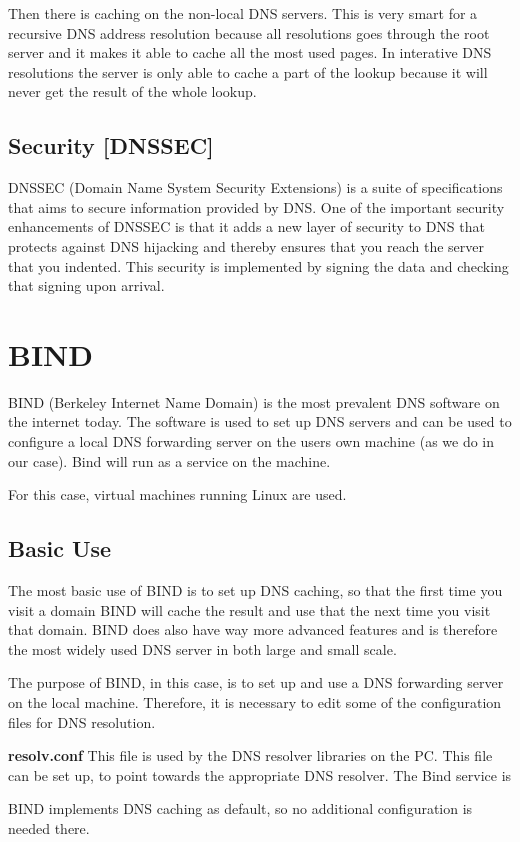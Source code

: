 Then there is caching on the non-local DNS servers. This is very smart for a recursive DNS address resolution because all resolutions goes through the root server and it makes it able to cache all the most used pages. In interative DNS resolutions the server is only able to cache a part of the lookup because it will never get the result of the whole lookup.

\subsection{Security [DNSSEC]}
DNSSEC (Domain Name System Security Extensions) is a suite of specifications that aims to secure information provided by DNS. One of the important security enhancements of DNSSEC is that it adds a new layer of security to DNS that protects against DNS hijacking and thereby ensures that you reach the server that you indented. This security is implemented by signing the data and checking that signing upon arrival.

\section{BIND}
BIND (Berkeley Internet Name Domain) is the most prevalent DNS software on the internet today. The software is used to set up DNS servers and can be used to configure a local DNS forwarding server on the users own machine (as we do in our case).
Bind will run as a service on the machine. 

For this case, virtual machines running Linux are used. 


\subsection{Basic Use}
The most basic use of BIND is to set up DNS caching, so that the first time you visit a domain BIND will cache the result and use that the next time you visit that domain.
BIND does also have way more advanced features and is therefore the most widely used DNS server in both large and small scale.

The purpose of BIND, in this case, is to set up and use a DNS forwarding server on the local machine. 
Therefore, it is necessary to edit some of the configuration files for DNS resolution.

\textbf{resolv.conf}
This file is used by the DNS resolver libraries on the PC. This file can be set up, to point towards the appropriate DNS resolver. The Bind service is 

BIND implements DNS caching as default, so no additional configuration is needed there. 



